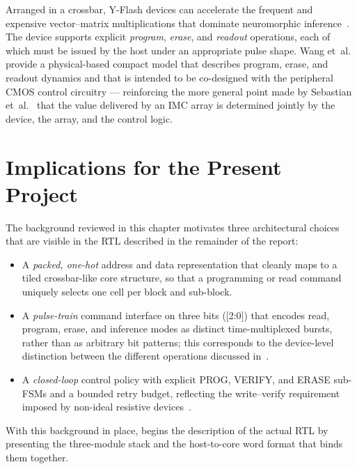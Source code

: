 Arranged in a crossbar, Y-Flash devices can accelerate the frequent and
expensive vector--matrix multiplications that dominate neuromorphic
inference~\cite{Wang2022YFlash}. The device supports explicit
\emph{program}, \emph{erase}, and \emph{readout} operations, each of which
must be issued by the host under an appropriate pulse shape. Wang
et~al.~\cite{Wang2022YFlash} provide a physical-based compact model that
describes program, erase, and readout dynamics and that is intended to be
co-designed with the peripheral CMOS control circuitry --- reinforcing
the more general point made by Sebastian et~al.~\cite{Sebastian2020IMC}
that the value delivered by an IMC array is determined jointly by the
device, the array, and the control logic.

\section{Implications for the Present Project}
\label{sec:bg-implications}

The background reviewed in this chapter motivates three architectural
choices that are visible in the RTL described in the remainder of the
report:

\begin{itemize}
    \item A \emph{packed, one-hot} address and data representation that
          cleanly maps to a tiled crossbar-like core structure, so that
          a programming or read command uniquely selects one cell per
          block and sub-block.
    \item A \emph{pulse-train} command interface on three bits
          ([2:0]) that encodes read, program, erase, and
          inference modes as distinct time-multiplexed bursts, rather
          than as arbitrary bit patterns; this corresponds to the
          device-level distinction between the different operations
          discussed in~\cite{Wang2022YFlash, Sebastian2020IMC}.
    \item A \emph{closed-loop} control policy with explicit PROG, VERIFY,
          and ERASE sub-FSMs and a bounded retry budget, reflecting the
          write--verify requirement imposed by non-ideal resistive
          devices~\cite{Ielmini2018RRAM, Sebastian2020IMC}.
\end{itemize}

With this background in place,  begins the
description of the actual RTL by presenting the three-module stack and
the host-to-core word format that binds them together.
